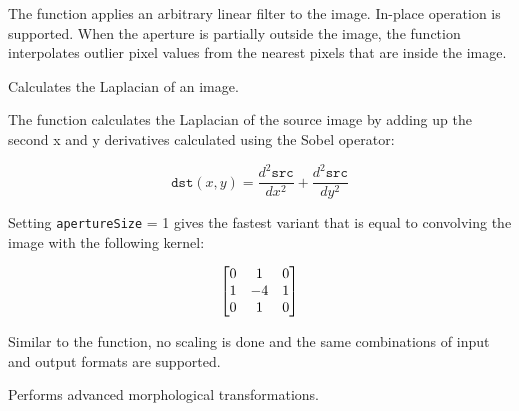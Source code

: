 The function applies an arbitrary linear filter to the image. In-place operation is supported. When the aperture is partially outside the image, the function interpolates outlier pixel values from the nearest pixels that are inside the image.

Calculates the Laplacian of an image.

\begin{description}
\end{description}

The function calculates the Laplacian of the source image by adding up the second x and y derivatives calculated using the Sobel operator:

\[
\texttt{dst}(x,y) = \frac{d^2 \texttt{src}}{dx^2} + \frac{d^2 \texttt{src}}{dy^2}
\]

Setting \texttt{apertureSize} = 1 gives the fastest variant that is equal to convolving the image with the following kernel:

\[ \begin{bmatrix} 0 & 1 & 0\\ 1 & -4 & 1\\ 0 & 1 & 0 \end{bmatrix} \]

Similar to the  function, no scaling is done and the same combinations of input and output formats are supported.

Performs advanced morphological transformations.


\begin{description}
\end{description}


